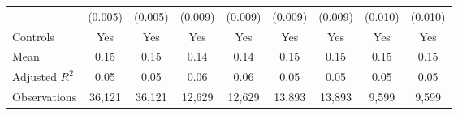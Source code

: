 {\begin{tabular}{l*{8}{c}}
                    &     (0.005)         &     (0.005)         &     (0.009)         &     (0.009)         &     (0.009)         &     (0.009)         &     (0.010)         &     (0.010)         \\
Controls            &         Yes         &         Yes         &         Yes         &         Yes         &         Yes         &         Yes         &         Yes         &         Yes         \\
\hline
Mean                &        0.15         &        0.15         &        0.14         &        0.14         &        0.15         &        0.15         &        0.15         &        0.15         \\
Adjusted \(R^{2}\)  &        0.05         &        0.05         &        0.06         &        0.06         &        0.05         &        0.05         &        0.05         &        0.05         \\
Observations        &      36,121         &      36,121         &      12,629         &      12,629         &      13,893         &      13,893         &       9,599         &       9,599         \\
\hline\hline
\end{tabular}
}
